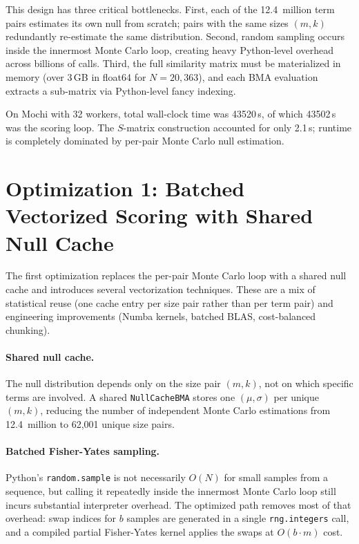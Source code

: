 \documentclass[11pt,a4paper]{article}
\begin{document}
This design has three critical bottlenecks. First, each of the 12.4~million
term pairs estimates its own null from scratch; pairs with the same sizes
$(m,k)$ redundantly re-estimate the same distribution. Second,
random sampling occurs inside the innermost Monte Carlo loop, creating heavy
Python-level overhead across billions of calls. Third, the full similarity
matrix must be materialized in memory (over 3\,GB in float64 for
$N = 20{,}363$), and each BMA evaluation extracts a sub-matrix via
Python-level fancy indexing.

On Mochi with 32 workers, total wall-clock time was \num{43520}\,s, of which
\num{43502}\,s was the scoring loop. The $S$-matrix construction accounted for
only 2.1\,s; runtime is completely dominated by per-pair Monte Carlo null
estimation.

\section{Optimization 1: Batched Vectorized Scoring with Shared Null Cache}

The first optimization replaces the per-pair Monte Carlo loop with a shared
null cache and introduces several vectorization techniques. These are a mix of
statistical reuse (one cache entry per size pair rather than per term pair)
and engineering improvements (Numba kernels, batched BLAS, cost-balanced
chunking).

\paragraph{Shared null cache.}
The null distribution depends only on the size pair $(m,k)$, not on which
specific terms are involved. A shared \texttt{NullCacheBMA} stores one
$(\mu, \sigma)$ per unique $(m,k)$, reducing the number of independent Monte
Carlo estimations from 12.4~million to 62{,}001 unique size pairs.

\paragraph{Batched Fisher-Yates sampling.}
Python's \texttt{random.sample} is not necessarily $O(N)$ for small samples
from a sequence, but calling it repeatedly inside the innermost Monte Carlo
loop still incurs substantial interpreter overhead. The optimized path
removes most of that overhead: swap indices for $b$ samples are generated in
a single \texttt{rng.integers} call, and a compiled partial Fisher-Yates
kernel applies the swaps at $O(b \cdot m)$ cost.
\end{document}
